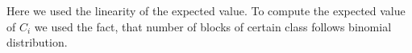 Here we used the linearity of the expected value. To compute the expected value of
$C_i$ we used the fact, that number of blocks of certain class follows binomial
distribution.

